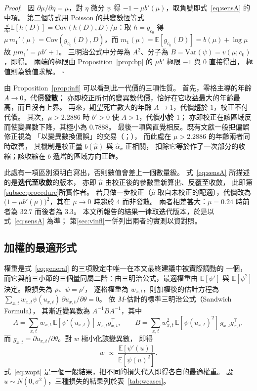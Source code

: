 \documentclass[UTF8, fontset=macnew, a4paper, 12pt]{ctexart}
\newenvironment{proof}{\par\noindent\textit{Proof}.\ }{\hfill$\square$\par\vspace{4pt}}
\newcommand{\Ex}{\mathbb{E}}
\begin{document}
\begin{proof}
因 $\partial\mu/\partial\eta=\mu$，對 $\eta$ 微分 $\psi$ 得
$-1-\mu b'(\mu)$，取負號即式~\eqref{eq:sensA} 的中項。
第二個等式用 Poisson 的共變數恆等式
$\frac{d}{d\mu}\Ex[h(D)]=\mathrm{Cov}(h(D),D)/\mu$：取 $h=g_{c_0}$ 得
$\mu\,m_1'(\mu)=\mathrm{Cov}(g_{c_0}(D),D)$，而 $m_1(\mu)=\Ex[g_{c_0}(D)]
=b(\mu)+\log\mu$ 故 $\mu m_1'=\mu b'+1$。
三明治公式中分母為 $A^2$、分子為 $B=\mathrm{Var}(\psi)=v(\mu;c_0)$，即得。
兩端的極限由 Proposition~\ref{prop:bp} 的 $\mu b'$ 極限 $-1$ 與 $0$ 直接得出，
極值則為數值求解。
\end{proof}

由 Proposition~\ref{prop:infl} 可以看到此一代價的三項性質。
首先，零格主導的年齡 $A\to0$，代價\textbf{發散}；
亦即校正所付的變異數代價，恰好在它收益最大的年齡最高，而且沒有上界。
再來，期望死亡數大的年齡 $A\to1$，代價趨於 $1$，校正不付代價。
其次，$\mu>2.2886$ 時 $b'>0$ 使 $A>1$，代價\textbf{小於 $1$}；
亦即校正在該區域反而使變異數下降，其極小為 $0.7888$。
最後一項與直覺相反。既有文獻一般把偏誤修正視為
「以變異數換偏誤」的交易（\citealp{firth1993}；\citealp{huber2009}），
而此處在 $\mu>2.2886$ 的年齡兩者同時改善，
其機制是校正量 $b(\hat\mu)$ 與 $\hat\alpha_x$ 正相關，
扣除它等於作了一次部分的收縮；該收縮在 $b$ 遞增的區域方向正確。

此處有一項區別須明白寫出，否則數值會差上一個數量級。
式~\eqref{eq:sensA} 所描述的是\textbf{迭代至收斂}的版本，
亦即 $\hat\mu$ 由校正後的參數重新算出、反覆至收斂，
此即第\ref{subsec:procedure}所實作者。
若只做一步校正（$\hat\mu$ 取自未校正的配適），代價改為
$\bigl(1-\mu b'(\mu)\bigr)^2$，其在 $\mu\to0$ 時趨於 $4$ 而非發散。
兩者相差甚大：$\mu=0.24$ 時前者為 $32.7$ 而後者為 $3.3$。
本文所報告的結果一律取迭代版本，於是以式~\eqref{eq:sensA} 為準；
第\ref{sec:vinfl}一併列出兩者的實測以資對照。

\subsection{加權的最適形式}\label{sec:weight}

權重是式~\eqref{eq:general} 的三項設定中唯一在本文最終建議中被實際調動的
一個，而它與前三小節的三個量同屬二階：由三明治公式，最適權重由
$\Ex[\psi']$ 與 $\Ex[\psi^2]$ 決定。設損失為 $\rho$、$\psi=\rho'$，
逐格權重為 $w_{x,t}$，則加權後的估計方程為
$\sum_{x,t}w_{x,t}\psi(u_{x,t})\,\partial u_{x,t}/\partial\theta=0$。
依 $M$-估計的標準三明治公式（Sandwich Formula），
其漸近變異數為 $A^{-1}BA^{-1}$，其中
\[
A=\sum_{x,t} w_{x,t}\,\Ex[\psi'(u_{x,t})]\,g_{x,t}g_{x,t}^{\top},\qquad
B=\sum_{x,t} w_{x,t}^{2}\,\Ex[\psi(u_{x,t})^{2}]\,g_{x,t}g_{x,t}^{\top},
\]
而 $g_{x,t}=\partial u_{x,t}/\partial\theta$。對 $w$ 極小化該變異數，
即得
\begin{equation}\label{eq:wopt}
w\;\propto\;\frac{\Ex[\psi'(u)]}{\Ex[\psi(u)^{2}]} .
\end{equation}
式~\eqref{eq:wopt} 是一個一般結果，把不同的損失代入即得各自的最適權重。
設 $u\sim N(0,\sigma^2)$，三種損失的結果列於表~\ref{tab:wcases}。
\end{document}
